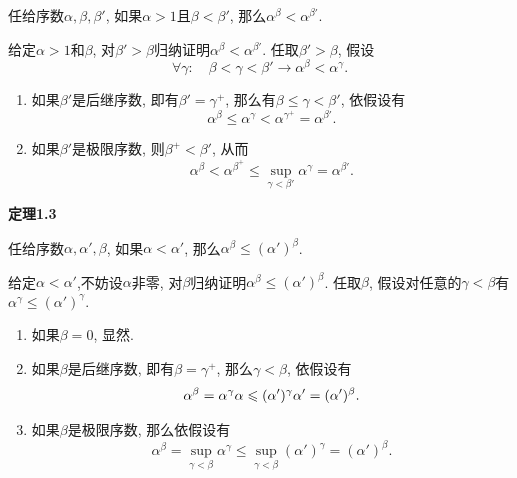 \documentclass[UTF8]{ctexart}
\begin{document}
任给序数$\alpha,\beta,\beta'$, 如果$\alpha>1$且$\beta<\beta'$,
那么$\alpha^\beta<\alpha^{\beta'}$.


给定$\alpha>1$和$\beta$, 对$\beta'>\beta$归纳证明$\alpha^\beta<\alpha^{\beta'}$.
任取$\beta'>\beta$, 假设
\[
    \forall\gamma:\quad\beta<\gamma<\beta'\to\alpha^\beta<\alpha^\gamma.
\]

\begin{enumerate}
    \item 如果$\beta'$是后继序数, 即有$\beta'=\gamma^+$,
    那么有$\beta\leqslant\gamma<\beta'$, 依假设有
    \[
        \alpha^\beta\leqslant\alpha^\gamma<\alpha^{\gamma^+}=\alpha^{\beta'}.
    \]
    \item 如果$\beta'$是极限序数, 则$\beta^+<\beta'$, 从而
    \begin{equation*}
        \alpha^\beta<\alpha^{\beta^+}\leqslant
        \sup_{\gamma<\beta'}\alpha^\gamma=\alpha^{\beta'}.
    \tag*{\qedsymbol}\end{equation*}
\end{enumerate}

\vspace{10pt}

\hypertarget{sec:定理1.3}{}
\noindent\textbf{定理1.3}

任给序数$\alpha,\alpha',\beta$, 如果$\alpha<\alpha'$,
那么$\alpha^\beta\leqslant(\alpha')^\beta$.


给定$\alpha<\alpha'$,不妨设$\alpha$非零,
对$\beta$归纳证明$\alpha^\beta\leqslant(\alpha')^\beta$.
任取$\beta$, 假设对任意的$\gamma<\beta$有$\alpha^\gamma\leqslant(\alpha')^\gamma$.

\begin{enumerate}
    \item 如果$\beta=0$, 显然.
    \item 如果$\beta$是后继序数, 即有$\beta=\gamma^+$, 那么$\gamma<\beta$, 依假设有
    \[
        \alpha^\beta=\alpha^\gamma\alpha\leqslant
        (\alpha')^\gamma\alpha'=(\alpha')^\beta.\\[1pt]
    \]
    \item 如果$\beta$是极限序数, 那么依假设有
    \vspace{-1pt}
    \begin{equation*}
        \alpha^\beta=\sup_{\gamma<\beta}\alpha^\gamma\leqslant
        \sup_{\gamma<\beta}(\alpha')^\gamma=(\alpha')^\beta.
    \tag*{\qedsymbol}\end{equation*}
\end{enumerate}
\end{document}
